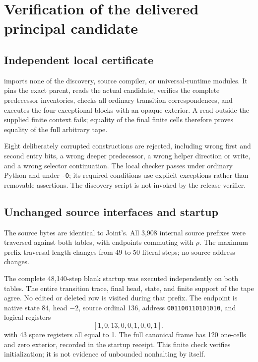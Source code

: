 \documentclass[11pt,letterpaper]{article}
\newcommand{\art}[1]{\path{#1}}
\begin{document}
\section{Verification of the delivered principal candidate}
\label{sec:verification}

\subsection{Independent local certificate}

\art{code/verify_fold.py} imports none of the discovery, source compiler,
or universal-runtime modules. It pins the exact parent, reads the actual
candidate, verifies the complete predecessor inventories, checks all
ordinary transition correspondences, and executes the four exceptional
blocks with an opaque exterior. A read outside the supplied finite
context fails; equality of the final finite cells therefore proves equality
of the full arbitrary tape.

Eight deliberately corrupted constructions are rejected, including wrong
first and second entry bits, a wrong deeper predecessor, a wrong helper
direction or write, and a wrong selector continuation. The local checker
passes under ordinary Python and under \texttt{-O}; its required conditions
use explicit exceptions rather than removable assertions. The discovery
script is not invoked by the release verifier.

\subsection{Unchanged source interfaces and startup}

The source bytes are identical to Joint's. All 3,908 internal source
prefixes were traversed against both tables, with endpoints commuting
with \(\rho\). The maximum prefix traversal length changes from 49 to
50 literal steps; no source address changes.

The complete 48,140-step blank startup was executed independently on
both tables. The entire transition trace, final head, state, and finite
support of the tape agree. No edited or deleted row is visited during
that prefix. The endpoint is native state 84, head \(-2\), source
ordinal 136, address \texttt{001100110101010}, and logical registers
\[
[1,0,13,0,0,1,0,0,1],
\]
with 43 spare registers all equal to 1. The full canonical frame has
120 one-cells and zero exterior, recorded in the startup receipt.
This finite check verifies initialization; it is not evidence of
unbounded nonhalting by itself.
\end{document}
